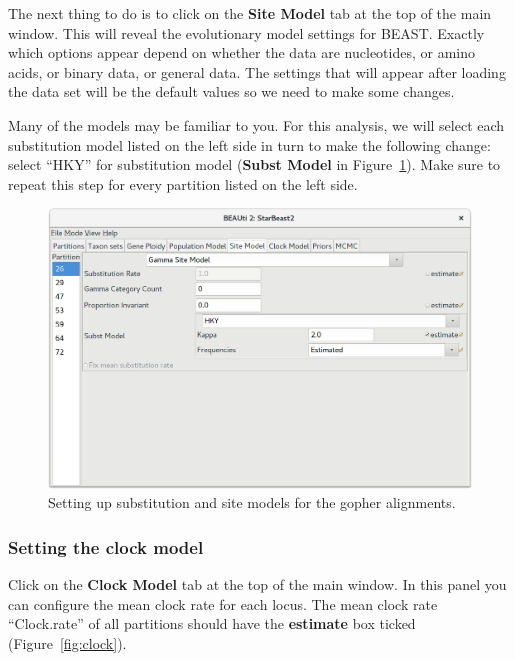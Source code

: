 \documentclass{article}
\begin{document}
The next thing to do is to click on the \textbf{Site Model} tab at the top of
the main window. This will reveal the evolutionary model settings for BEAST.
Exactly which options appear depend on whether the data are nucleotides, or
amino acids, or binary data, or general data. The settings that will appear
after loading the data set will be the default values so we need to make some
changes.

Many of the models may be familiar to you. For this analysis, we will select
each substitution model listed on the left side in turn to make the following
change: select ``HKY'' for substitution model (\textbf{Subst Model} in
Figure~\ref{fig:HKY}). Make sure to repeat this step for every partition listed
on the left side.

\begin{figure}[htb!]
\centering
\includegraphics[width=\textwidth]{figures/beauti-hky.png}
\caption{Setting up substitution and site models for the gopher alignments.}
\label{fig:HKY}
\end{figure}

\clearpage

\subsubsection*{Setting the clock model}

Click on the \textbf{Clock Model} tab at the top of the main window. In this
panel you can configure the mean clock rate for each locus. The
mean clock rate ``Clock.rate'' of all partitions should have the
\textbf{estimate} box ticked (Figure~\ref{fig:clock}).
\end{document}
